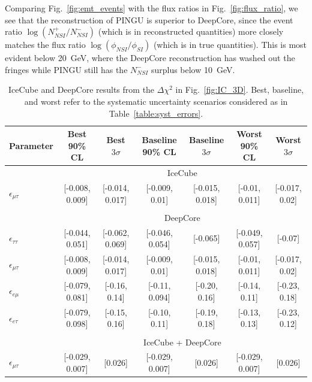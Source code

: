 \documentclass[draft=True]{revtex4-2}
\newcommand{\emt}{\ensuremath{\epsilon_{\mu\tau}}}
\newcommand{\eet}{\epsilon_{e\tau}}
\newcommand{\eem}{\epsilon_{e\mu}}
\newcommand{\ett}{\ensuremath{\epsilon_{\tau\tau}}}
\begin{document}
{Comparing Fig.~\ref{fig:emt_events} with the flux ratios in Fig.~\ref{fig:flux_ratio}, we see that the reconstruction of PINGU is
superior to DeepCore, since the event ratio $\log{(N^+_{NSI}/N^-_{NSI})}$ (which is in reconstructed quantities) more closely matches the flux ratio $\log{(\phi_{NSI}/\phi_{SI})}$ (which is in true quantities).
This is most evident below \SI{20}{\GeV}, where the DeepCore reconstruction has washed out the fringes while PINGU still has the $N^-_{NSI}$ surplus below \SI{10}{\GeV}.

{\renewcommand{\arraystretch}{1.3}
 \begin{table}
   \begin{center}
   \begin{tabular}{lcccccc}
      \hline \hline
      Parameter & Best 90\% CL & Best $3\sigma$& Baseline 90\% CL & Baseline $3\sigma$ & Worst 90\% CL & Worst $3\sigma$\\
      \hline & \multicolumn{6}{c}{IceCube}  \\
      $\emt$ &  [-0.008, 0.009] &  [-0.014, 0.017] &   [-0.009, 0.01] &  [-0.015, 0.018] &   [-0.01, 0.011] &   [-0.017, 0.02] \\\\
      & \multicolumn{6}{c}{DeepCore}\\ [0.3em]
      $\ett$ &  [-0.044, 0.051] &  [-0.062, 0.069] &  [-0.046, 0.054] &         [-0.065] &  [-0.049, 0.057] &          [-0.07] \\
      $\emt$ &  [-0.008, 0.009] &  [-0.014, 0.017] &   [-0.009, 0.01] &  [-0.015, 0.018] &   [-0.01, 0.011] &   [-0.017, 0.02] \\
      $\eem$ &  [-0.079, 0.081] &   [-0.16, 0.14] &  [-0.11, 0.094] &  [-0.20, 0.16] &   [-0.14, 0.11] &   [-0.23, 0.18] \\
      $\eet$ &  [-0.079, 0.098] &  [-0.15, 0.16] &   [-0.10, 0.11] &  [-0.19, 0.18] &  [-0.13, 0.13] &  [-0.23, 0.12] \\\\
      &\multicolumn{6}{c}{IceCube + DeepCore}\\
      $\emt$ &  [-0.029, 0.007] &          [0.026] &  [-0.029, 0.007] &          [0.026] &  [-0.029, 0.007] &          [0.026] \\
      \hline
      \hline
   \end{tabular}
   \end{center}
   \caption{IceCube and DeepCore results from the $\Delta \chi^2$ in Fig.~\ref{fig:IC_3D}. Best, baseline, and worst refer to 
   the systematic uncertainty scenarios considered as in Table~\ref{table:syst_errors}.}\label{table:IC_DC_results}

\end{table}}}
\end{document}

